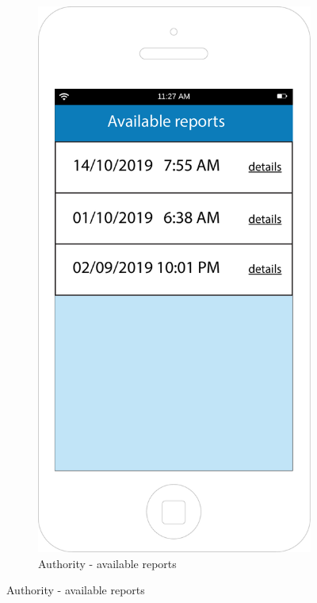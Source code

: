 \documentclass[12pt,a4paper]{report}
\begin{document}
\begin{figure}[H]
\begin{subfigure}{0.5\textwidth}
		\end{subfigure}
		\begin{subfigure}{0.5\textwidth}
			\includegraphics[scale=0.25, center]{Availablereports}
			\caption{Authority - available reports}
			\label{Authority - available reports}
		\end{subfigure}
		\end{figure}
\end{document}
